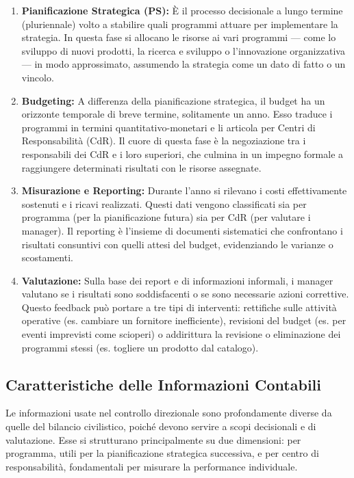 \documentclass[a4paper,10pt]{article}
\begin{document}
\begin{enumerate}
    \item \textbf{Pianificazione Strategica (PS):} È il processo decisionale a lungo termine (pluriennale) volto a stabilire quali programmi attuare per implementare la strategia. In questa fase si allocano le risorse ai vari programmi — come lo sviluppo di nuovi prodotti, la ricerca e sviluppo o l'innovazione organizzativa — in modo approssimato, assumendo la strategia come un dato di fatto o un vincolo.
    
    \item \textbf{Budgeting:} A differenza della pianificazione strategica, il budget ha un orizzonte temporale di breve termine, solitamente un anno. Esso traduce i programmi in termini quantitativo-monetari e li articola per Centri di Responsabilità (CdR). Il cuore di questa fase è la negoziazione tra i responsabili dei CdR e i loro superiori, che culmina in un impegno formale a raggiungere determinati risultati con le risorse assegnate.
    
    \item \textbf{Misurazione e Reporting:} Durante l'anno si rilevano i costi effettivamente sostenuti e i ricavi realizzati. Questi dati vengono classificati sia per programma (per la pianificazione futura) sia per CdR (per valutare i manager). Il reporting è l'insieme di documenti sistematici che confrontano i risultati consuntivi con quelli attesi del budget, evidenziando le varianze o scostamenti.
    
    \item \textbf{Valutazione:} Sulla base dei report e di informazioni informali, i manager valutano se i risultati sono soddisfacenti o se sono necessarie azioni correttive. Questo feedback può portare a tre tipi di interventi: rettifiche sulle attività operative (es. cambiare un fornitore inefficiente), revisioni del budget (es. per eventi imprevisti come scioperi) o addirittura la revisione o eliminazione dei programmi stessi (es. togliere un prodotto dal catalogo).
\end{enumerate}

\subsection*{Caratteristiche delle Informazioni Contabili}

Le informazioni usate nel controllo direzionale sono profondamente diverse da quelle del bilancio civilistico, poiché devono servire a scopi decisionali e di valutazione. Esse si strutturano principalmente su due dimensioni: per programma, utili per la pianificazione strategica successiva, e per centro di responsabilità, fondamentali per misurare la performance individuale. 
\end{document}
